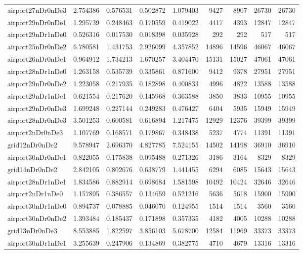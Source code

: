 \begin{longtable}{|l|r|r|r|r|r|r|r|r|}
airport27nDr0nDe3 & 2.754386 & 0.576531 & 0.502872 & 1.079403 & 9427 & 8907 & 26730 & 26730 \\
airport29nDr0nDe1 & 1.295739 & 0.248463 & 0.170559 & 0.419022 & 4417 & 4393 & 12847 & 12847 \\
airport29nDr1nDe0 & 0.526316 & 0.017530 & 0.018398 & 0.035928 & 292 & 292 & 517 & 517 \\
airport25nDr0nDe2 & 6.780581 & 1.431753 & 2.926099 & 4.357852 & 14896 & 14596 & 46067 & 46067 \\
airport26nDr0nDe1 & 0.964912 & 1.734213 & 1.670257 & 3.404470 & 15131 & 15027 & 47061 & 47061 \\
airport28nDr1nDe0 & 1.263158 & 0.535739 & 0.335861 & 0.871600 & 9412 & 9378 & 27951 & 27951 \\
airport29nDr0nDe2 & 1.223058 & 0.217935 & 0.182898 & 0.400833 & 4996 & 4822 & 13588 & 13588 \\
airport29nDr1nDe1 & 0.621554 & 0.217620 & 0.145968 & 0.363588 & 3850 & 3833 & 10955 & 10955 \\
airport29nDr0nDe3 & 1.699248 & 0.227144 & 0.249283 & 0.476427 & 6404 & 5935 & 15949 & 15949 \\
airport28nDr0nDe3 & 3.501253 & 0.600581 & 0.616894 & 1.217475 & 12929 & 12376 & 39399 & 39399 \\
airport2nDr0nDe3 & 1.107769 & 0.168571 & 0.179867 & 0.348438 & 5237 & 4774 & 11391 & 11391 \\
grid12nDr0nDe2 & 9.578947 & 2.696370 & 4.827785 & 7.524155 & 14502 & 14198 & 36910 & 36910 \\
airport30nDr0nDe1 & 0.822055 & 0.175838 & 0.095488 & 0.271326 & 3186 & 3164 & 8329 & 8329 \\
grid14nDr0nDe2 & 2.842105 & 0.802676 & 0.638779 & 1.441455 & 6294 & 6085 & 15643 & 15643 \\
airport28nDr1nDe1 & 1.834586 & 0.882914 & 0.698684 & 1.581598 & 10492 & 10424 & 32646 & 32646 \\
airport2nDr1nDe0 & 1.157895 & 0.386557 & 0.134659 & 0.521216 & 5636 & 5618 & 15900 & 15900 \\
airport30nDr1nDe0 & 0.894737 & 0.078885 & 0.046070 & 0.124955 & 1514 & 1514 & 3560 & 3560 \\
airport30nDr0nDe2 & 1.393484 & 0.185437 & 0.171898 & 0.357335 & 4182 & 4005 & 10288 & 10288 \\
grid13nDr0nDe3 & 8.553885 & 1.822597 & 3.856103 & 5.678700 & 12584 & 11969 & 33373 & 33373 \\
airport30nDr1nDe1 & 3.255639 & 0.247906 & 0.134869 & 0.382775 & 4710 & 4679 & 13316 & 13316 \\

\end{longtable}
